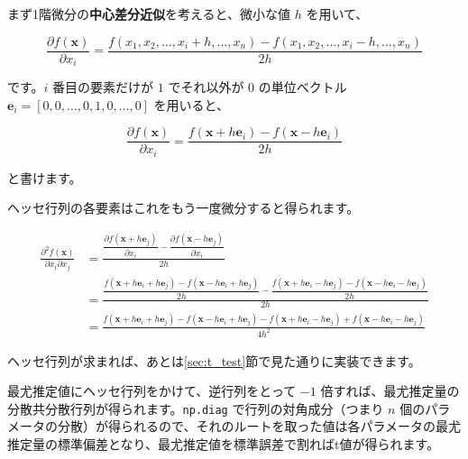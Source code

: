     まず1階微分の\textbf{中心差分近似}を考えると、微小な値 $h$ を用いて、
    
    \begin{equation}
        \frac{\partial f(\boldsymbol x)}{\partial x_i} = \frac{f(x_1, x_2,\ldots, x_i+h, \ldots, x_n) - f(x_1, x_2,\ldots, x_i-h, \ldots, x_n)}{2h}
    \end{equation}
    
    です。$i$ 番目の要素だけが $1$ でそれ以外が $0$ の単位ベクトル $\boldsymbol e_i = [0,0,\ldots,0,1,0,\ldots,0]$ を用いると、
    
    \begin{equation}
        \frac{\partial f(\boldsymbol x)}{\partial x_i} = \frac{f(\boldsymbol x + h\boldsymbol e_i) - f(\boldsymbol x - h\boldsymbol e_i)}{2h}
    \end{equation}
    
    と書けます。
    
    ヘッセ行列の各要素はこれをもう一度微分すると得られます。
    
    \begin{equation}
        \begin{aligned}
            \frac{\partial^2 f(\boldsymbol x)}{\partial x_i \partial x_j}
             & = \frac{\dfrac{\partial f(\boldsymbol x + h\boldsymbol e_j)}{\partial x_i} - \dfrac{\partial f(\boldsymbol x - h\boldsymbol e_j)}{\partial x_i}}{2h}                                                                                                                   \\
             & = \frac{\dfrac{f(\boldsymbol x + h\boldsymbol e_i + h\boldsymbol e_j) - f(\boldsymbol x - h\boldsymbol e_i + h\boldsymbol e_j)}{2h} - \dfrac{f(\boldsymbol x + h\boldsymbol e_i - h\boldsymbol e_j) - f(\boldsymbol x - h\boldsymbol e_i - h\boldsymbol e_j)}{2h}}{2h} \\
             & = \frac{f(\boldsymbol x + h\boldsymbol e_i + h\boldsymbol e_j) - f(\boldsymbol x - h\boldsymbol e_i + h\boldsymbol e_j) -f(\boldsymbol x + h\boldsymbol e_i - h\boldsymbol e_j) + f(\boldsymbol x - h\boldsymbol e_i - h\boldsymbol e_j)}{4h^2}
        \end{aligned}
    \end{equation}
    
    ヘッセ行列が求まれば、あとは\ref{sec:t_test}節で見た通りに実装できます。
    
    最尤推定値にヘッセ行列をかけて、逆行列をとって $-1$ 倍すれば、最尤推定量の分散共分散行列が得られます。\lstinline{np.diag} で行列の対角成分（つまり $n$ 個のパラメータの分散）が得られるので、それのルートを取った値は各パラメータの最尤推定量の標準偏差となり、最尤推定値を標準誤差で割ればt値が得られます。
    
